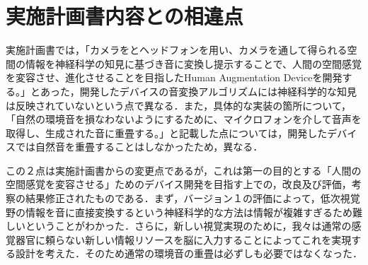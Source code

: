 \section{実施計画書内容との相違点}
実施計画書では，「カメラをとヘッドフォンを用い、カメラを通して得られる空間の情報を神経科学の知見に基づき音に変換し提示することで、人間の空間感覚を変容させ、進化させることを目指したHuman Augmentation Deviceを開発する。」とあった，開発したデバイスの音変換アルゴリズムには神経科学的な知見は反映されていないという点で異なる．また，具体的な実装の箇所について，「自然の環境音を損なわないようにするために、マイクロフォンを介して音声を取得し、生成された音に重畳する。」と記載した点については，開発したデバイスでは自然音を重畳することはしなかったため，異なる．

この２点は実施計画書からの変更点であるが，これは第一の目的とする「人間の空間感覚を変容させる」ためのデバイス開発を目指す上での，改良及び評価，考察の結果修正されたものである．まず，バージョン１の評価によって，低次視覚野の情報を音に直接変換するという神経科学的な方法は情報が複雑すぎるため難しいということがわかった．さらに，新しい視覚実現のために，我々は通常の感覚器官に頼らない新しい情報リソースを脳に入力することによってこれを実現する設計を考えた．そのため通常の環境音の重畳は必ずしも必要ではなくなった．